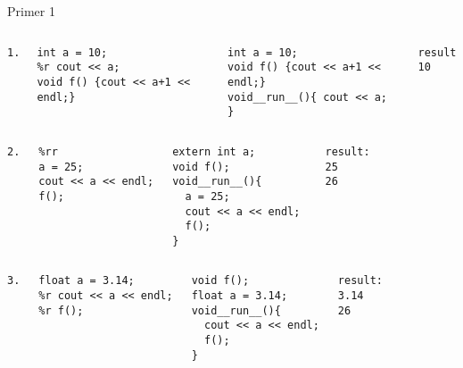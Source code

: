\documentclass{beamer}
\begin{document}
\begin{frame}[fragile] {Primer 1}

  \fontsize{8pt}{0.2pt}


  \begin{columns}
    \column[t]{0.2cm}
\begin{verbatim}
1.
\end{verbatim}
    \column[t]{4.5cm}
\begin{verbatim}
int a = 10;
%r cout << a;
void f() {cout << a+1 << endl;}
\end{verbatim}
    \column[t]{4.5cm}
\begin{verbatim}
int a = 10;
void f() {cout << a+1 << endl;}
void__run__(){ cout << a; }
\end{verbatim}
    \column[t]{1.5cm}
\begin{verbatim}
result:
10
\end{verbatim}
  \end{columns}


    \begin{columns}
    \column[t]{0.1cm}
\begin{verbatim}
2.
\end{verbatim}
      \column[t]{4.5cm}
\begin{verbatim}
%rr
a = 25;
cout << a << endl;
f();
\end{verbatim}
      \column[t]{4.5cm}
\begin{verbatim}
extern int a;
void f();
void__run__(){ 
  a = 25;
  cout << a << endl; 
  f();
}
\end{verbatim}
    \column[t]{1.5cm}
\begin{verbatim}
result:
25
26
\end{verbatim}
    \end{columns}


    \begin{columns}
    \column[t]{0.1cm}
\begin{verbatim}
3.
\end{verbatim}
      \column[t]{4.5cm}
\begin{verbatim}
float a = 3.14;
%r cout << a << endl;
%r f();
\end{verbatim}
      \column[t]{4.5cm}
\begin{verbatim}
void f();
float a = 3.14;
void__run__(){ 
  cout << a << endl;
  f(); 
}
\end{verbatim}
    \pause
    \column[t]{1.5cm}
\begin{verbatim}
result:
3.14
26
\end{verbatim}
    \end{columns}
    \pause




\end{frame}
\end{document}
